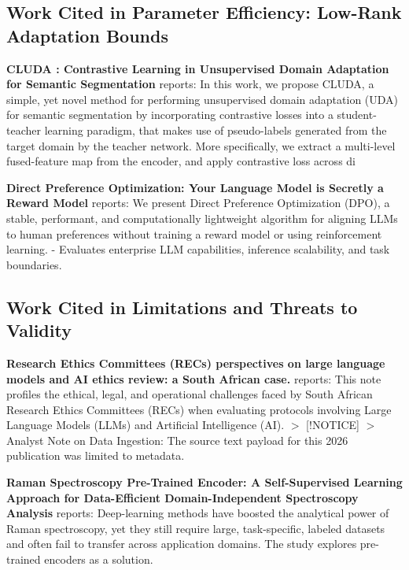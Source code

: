 \documentclass[10pt,twocolumn,letterpaper]{article}
\begin{document}
\subsection{Work Cited in Parameter Efficiency: Low-Rank Adaptation Bounds}


\textbf{CLUDA : Contrastive Learning in Unsupervised Domain Adaptation for Semantic Segmentation} \cite{arxiv_2208_14227} reports: In this work, we propose CLUDA, a simple, yet novel method for performing unsupervised domain adaptation (UDA) for semantic segmentation by incorporating contrastive losses into a student-teacher learning paradigm, that makes use of pseudo-labels generated from the target domain by the teacher network. More specifically, we extract a multi-level fused-feature map from the encoder, and apply contrastive loss across di

\textbf{Direct Preference Optimization: Your Language Model is Secretly a Reward Model} \cite{arxiv_2305_18290} reports: We present Direct Preference Optimization (DPO), a stable, performant, and computationally lightweight algorithm for aligning LLMs to human preferences without training a reward model or using reinforcement learning. - Evaluates enterprise LLM capabilities, inference scalability, and task boundaries.


\subsection{Work Cited in Limitations and Threats to Validity}


\textbf{Research Ethics Committees (RECs) perspectives on large language models and AI ethics review: a South African case.} \cite{pubmed_42380865} reports: This note profiles the ethical, legal, and operational challenges faced by South African Research Ethics Committees (RECs) when evaluating protocols involving Large Language Models (LLMs) and Artificial Intelligence (AI). $>$ [!NOTICE] $>$ Analyst Note on Data Ingestion: The source text payload for this 2026 publication was limited to metadata.

\textbf{Raman Spectroscopy Pre-Trained Encoder: A Self-Supervised Learning Approach for Data-Efficient Domain-Independent Spectroscopy Analysis} \cite{doaj_001772c2113c476d9d5d40452c8e10e1} reports: Deep-learning methods have boosted the analytical power of Raman spectroscopy, yet they still require large, task-specific, labeled datasets and often fail to transfer across application domains. The study explores pre-trained encoders as a solution.
\end{document}

